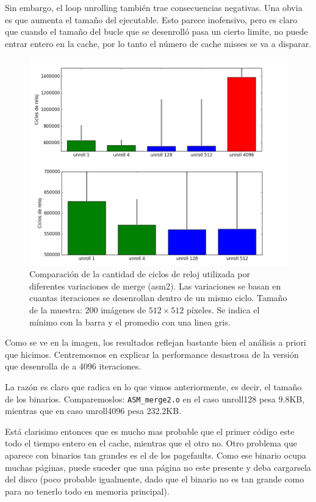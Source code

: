 Sin embargo, el loop unrolling también trae consecuencias negativas. Una obvia es que aumenta el tamaño del ejecutable. Esto parece inofensivo, pero es claro que cuando el tamaño del bucle que se desenrolló pasa un cierto limite, no puede entrar entero en la cache, por lo tanto el número de cache misses se va a disparar.

\begin{figure}[H] 
	\centering
  \includegraphics[scale=0.7]{images/merge-unroll.png}
  \caption{Comparación de la cantidad de ciclos de reloj utilizada por diferentes variaciones de merge (asm2). Las variaciones se basan en cuantas iteraciones se desenrollan dentro de un mismo ciclo. Tamaño de la muestra: 200 imágenes de $512 \times 512$ píxeles. Se indica el mínimo con la barra y el promedio con una linea gris.}
\end{figure}

Como se ve en la imagen, los resultados reflejan bastante bien el análisis a priori que hicimos. Centremosnos en explicar la performance desastrosa de la versión que desenrolla de a 4096 iteraciones.

La razón es claro que radica en lo que vimos anteriormente, es decir, el tamaño de los binarios. Comparemoslos: \texttt{ASM\_merge2.o} en el caso unroll128 pesa 9.8KB, mientras que en caso unroll4096 pesa 232.2KB.

Está clarisimo entonces que es mucho mas probable que el primer código este todo el tiempo entero en el cache, mientras que el otro no. Otro problema que aparece con binarios tan grandes es el de los pagefaults. Como ese binario ocupa muchas páginas, puede suceder que una página no este presente y deba cargarsela del disco (poco probable igualmente, dado que el binario no es tan grande como para no tenerlo todo en memoria principal).

